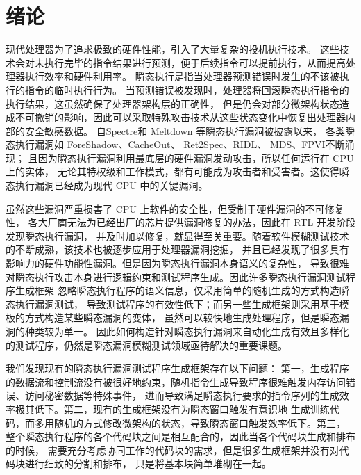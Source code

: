 \cleardoublepage

\section{绪论}

现代处理器为了追求极致的硬件性能，引入了大量复杂的投机执行技术\cite{gonzalez2010processor}。
这些技术会对未执行完毕的指令结果进行预测，便于后续指令可以提前执行，从而提高处理器执行效率和硬件利用率。
瞬态执行是指当处理器预测错误时发生的不该被执行的指令的临时执行行为。
当预测错误被发现时，处理器将回滚瞬态执行指令的执行结果，这虽然确保了处理器架构层的正确性，
但是仍会对部分微架构状态造成不可撤销的影响，因此可以采取特殊攻击技术从这些状态变化中恢复出处理器内部的安全敏感数据。
自Spectre\cite{kocher2020spectre}和 Meltdown\cite{horn2018meltdown} 等瞬态执行漏洞被披露以来，
各类瞬态执行漏洞如 ForeShadow\cite{van2018foreshadow}、CacheOut\cite{van2021cacheout}、
Ret2Spec\cite{maisuradze2018ret2spec}、RIDL\cite{mathure2023hardware}、
MDS\cite{minkin2019fallout}、FPVI\cite{ragab2021rage}不断涌现；
且因为瞬态执行漏洞利用最底层的硬件漏洞发动攻击，所以任何运行在 CPU 上的实体，
无论其特权级和工作模式，都有可能成为攻击者和受害者。这使得瞬态执行漏洞已经成为现代 CPU 中的关键漏洞。\par

虽然这些漏洞严重损害了 CPU 上软件的安全性，但受制于硬件漏洞的不可修复性，
各大厂商无法为已经出厂的芯片提供漏洞修复的办法，因此在 RTL 开发阶段发现瞬态执行漏洞，
并及时加以修复，就显得至关重要。随着软件模糊测试技术的不断成熟，该技术也被逐步应用于处理器漏洞挖掘，
并且已经发现了很多具有影响力的硬件功能性漏洞。但是因为瞬态执行漏洞本身语义的复杂性，
导致很难对瞬态执行攻击本身进行逻辑约束和测试程序生成。因此许多瞬态执行漏洞测试程序生成框架
忽略瞬态执行程序的语义信息，仅采用简单的随机生成的方式构造瞬态执行漏洞测试，
导致测试程序的有效性低下；而另一些生成框架则采用基于模板的方式构造某些瞬态漏洞的变体，
虽然可以较快地生成处理程序，但是瞬态漏洞的种类较为单一。
因此如何构造针对瞬态执行漏洞来自动化生成有效且多样化的测试程序，仍然是瞬态漏洞模糊测试领域亟待解决的重要课题。\par

我们发现现有的瞬态执行漏洞测试程序生成框架存在以下问题：
第一，生成程序的数据流和控制流没有被很好地约束，随机指令生成导致程序很难触发内存访问错误、访问秘密数据等特殊事件，
进而导致满足瞬态执行要求的指令序列的生成效率极其低下。第二，现有的生成框架没有为瞬态窗口触发有意识地
生成训练代码，而多用随机的方式修改微架构的状态，导致瞬态窗口触发效率低下。第三，
整个瞬态执行程序的各个代码块之间是相互配合的，因此当各个代码块生成和排布的时候，
需要充分考虑协同工作的代码块的需求，但是很多生成框架并没有对代码块进行细致的分割和排布，
只是将基本块简单堆砌在一起。\par

